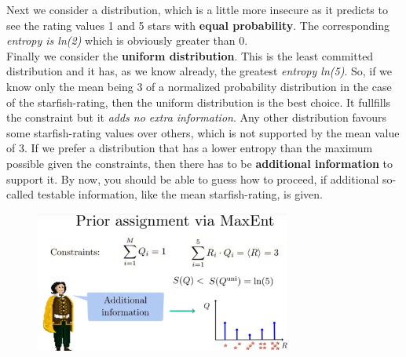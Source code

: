 \documentclass[12pt, a4paper]{scrartcl}
\begin{document}
Next we consider a distribution, which is a little more insecure as it predicts to see the rating values 1 and 5 stars
with \textbf{equal probability}. The corresponding \textit{entropy is ln(2)} which is
obviously greater than 0.\\

Finally we consider the \textbf{uniform distribution}. This is the least committed distribution and it has, as we know already, the greatest \textit{entropy ln(5)}.
So, if we know only the mean being 3 of a normalized probability distribution
in the case of the starfish-rating, then the uniform distribution is the best
choice. It fullfills the constraint but it \textit{adds no extra information}.
Any other distribution favours some starfish-rating values over others, which
is not supported by the mean value of 3.
If we prefer a distribution that has a lower entropy than the maximum possible 
given the constraints, then there has to be \textbf{additional information} to support it.
By now, you should be able to guess how to proceed, if additional so-called
testable information, like the mean starfish-rating, is given.\\%
 \begin{figure}[H]
	\centering
	\includegraphics[width=0.75\textwidth]{6_5.png}
\end{figure}
\end{document}
